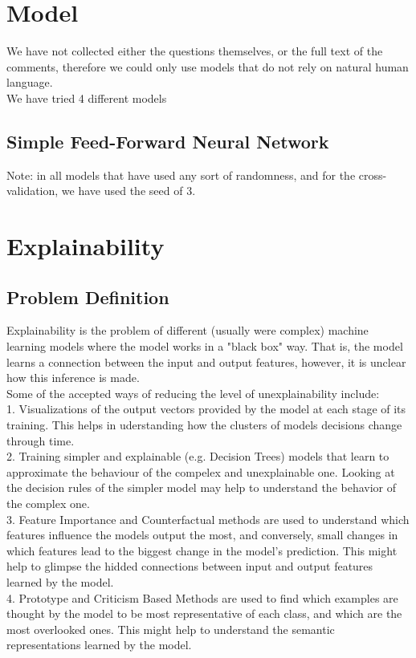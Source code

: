 \documentclass[11pt, oneside]{article}   	%
\begin{document}
\section{Model}
We have not collected either the questions themselves, or the full text of the comments, therefore we could only use models that do not rely on natural human language.\\
We have tried 4 different models 
\subsection{Simple Feed-Forward Neural Network}

Note: in all models that have used any sort of randomness, and for the cross-validation, we have used the seed of 3.

\section{Explainability}
\subsection{Problem Definition}
Explainability is the problem of different (usually were complex) machine learning models where the model works in a "black box" way. That is, the model learns a connection between the input and output features, however, it is unclear how this inference is made.\\

Some of the accepted ways of reducing the level of unexplainability include:\\
1. Visualizations of the output vectors provided by the model at each stage of its training. This helps in uderstanding how the clusters of models decisions change through time.\\
2. Training simpler and explainable (e.g. Decision Trees) models that learn to approximate the behaviour of the compelex and unexplainable one. Looking at the decision rules of the simpler model may help to understand the behavior of the complex one.\\
3. Feature Importance and Counterfactual methods are used to understand which features influence the models output the most, and conversely, small changes in which features lead to the biggest change in the model's prediction. This might help to glimpse the hidded connections between input and output features learned by the model.\\
4. Prototype and Criticism Based Methods are used to find which examples are thought by the model to be most representative of each class, and which are the most overlooked ones. This might help to understand the semantic representations learned by the model.
\end{document}
